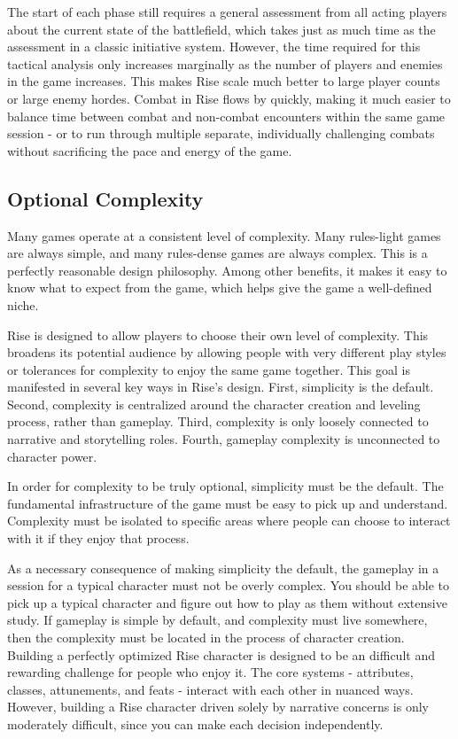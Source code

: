         The start of each phase still requires a general assessment from all acting players about the current state of the battlefield, which takes just as much time as the assessment in a classic initiative system.
        However, the time required for this tactical analysis only increases marginally as the number of players and enemies in the game increases.
        This makes Rise scale much better to large player counts or large enemy hordes.
        Combat in Rise flows by quickly, making it much easier to balance time between combat and non-combat encounters within the same game session - or to run through multiple separate, individually challenging combats without sacrificing the pace and energy of the game.

    \subsection{Optional Complexity}
        Many games operate at a consistent level of complexity.
        Many rules-light games are always simple, and many rules-dense games are always complex.
        This is a perfectly reasonable design philosophy.
        Among other benefits, it makes it easy to know what to expect from the game, which helps give the game a well-defined niche.

        Rise is designed to allow players to choose their own level of complexity.
        This broadens its potential audience by allowing people with very different play styles or tolerances for complexity to enjoy the same game together.
        This goal is manifested in several key ways in Rise's design.
        First, simplicity is the default.
        Second, complexity is centralized around the character creation and leveling process, rather than gameplay.
        Third, complexity is only loosely connected to narrative and storytelling roles.
        Fourth, gameplay complexity is unconnected to character power.

        In order for complexity to be truly optional, simplicity must be the default.
        The fundamental infrastructure of the game must be easy to pick up and understand.
        Complexity must be isolated to specific areas where people can choose to interact with it if they enjoy that process.

        As a necessary consequence of making simplicity the default, the gameplay in a session for a typical character must not be overly complex.
        You should be able to pick up a typical character and figure out how to play as them without extensive study.
        If gameplay is simple by default, and complexity must live somewhere, then the complexity must be located in the process of character creation.
        Building a perfectly optimized Rise character is designed to be an difficult and rewarding challenge for people who enjoy it.
        The core systems - attributes, classes, attunements, and feats - interact with each other in nuanced ways.
        However, building a Rise character driven solely by narrative concerns is only moderately difficult, since you can make each decision independently.

